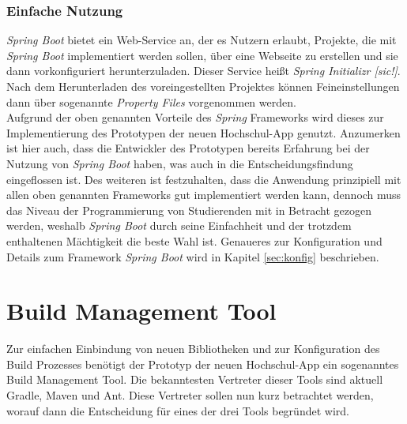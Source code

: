 \subsubsection*{Einfache Nutzung}
\textit{Spring Boot} bietet ein Web-Service an, der es Nutzern erlaubt, Projekte, die mit \textit{Spring Boot} implementiert werden sollen, über eine Webseite zu erstellen und sie dann vorkonfiguriert herunterzuladen. Dieser Service heißt \textit{Spring Initializr [sic!]}\autocite[Siehe][]{initializr}. Nach dem Herunterladen des voreingestellten Projektes können Feineinstellungen dann über sogenannte \textit{Property Files} vorgenommen werden.\\
\linebreak
Aufgrund der oben genannten Vorteile des \textit{Spring} Frameworks wird dieses zur Implementierung des Prototypen der neuen Hochschul-\ac{App} genutzt. Anzumerken ist hier auch, dass die Entwickler des Prototypen bereits Erfahrung bei der Nutzung von \textit{Spring Boot} haben, was auch in die Entscheidungsfindung eingeflossen ist. Des weiteren ist festzuhalten, dass die Anwendung prinzipiell mit allen oben genannten Frameworks gut implementiert werden kann, dennoch muss das Niveau der Programmierung von Studierenden mit in Betracht gezogen werden, weshalb \textit{Spring Boot} durch seine Einfachheit und der trotzdem enthaltenen Mächtigkeit die beste Wahl ist. Genaueres zur Konfiguration und Details zum Framework \textit{Spring Boot} wird in Kapitel \ref{sec:konfig} beschrieben.

\section{Build Management Tool}
\label{sec:build_tool}

Zur einfachen Einbindung von neuen Bibliotheken und zur Konfiguration des Build Prozesses benötigt der Prototyp der neuen Hochschul-\ac{App} ein sogenanntes Build Management Tool. Die bekanntesten Vertreter dieser Tools sind aktuell Gradle, Maven und Ant. Diese Vertreter sollen nun kurz betrachtet werden, worauf dann die Entscheidung für eines der drei Tools begründet wird.


